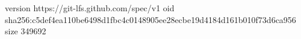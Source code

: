 version https://git-lfs.github.com/spec/v1
oid sha256:c5def4ea110be6498d1fbc4c0148905ee28ecbe19d4184d161b010f73d6ca956
size 349692
